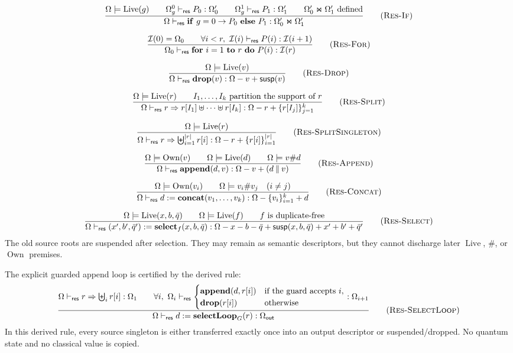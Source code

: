 \documentclass{report}
\theoremstyle{defn_style}
\providecommand{\Live}{\operatorname{Live}}
\providecommand{\Own}{\operatorname{Own}}
\providecommand{\susp}{\mathsf{susp}}
\begin{document}
\[
\frac{
  \Omega\models\Live(g)
  \qquad
  \Omega_g^0\vdash_{\mathsf{res}}P_0:\Omega_0'
  \qquad
  \Omega_g^1\vdash_{\mathsf{res}}P_1:\Omega_1'
  \qquad
  \Omega_0'\Join\Omega_1'\ \text{defined}
}{
  \Omega\vdash_{\mathsf{res}}
  \mathbf{if}\ g=0\rightarrow P_0\ \mathbf{else}\ P_1
  :
  \Omega_0'\Join\Omega_1'
}
\tag{\textsc{Res-If}}
\]

\[
\frac{
  \mathcal I(0)=\Omega_0
  \qquad
  \forall i<r,\ 
  \mathcal I(i)\vdash_{\mathsf{res}}P(i):\mathcal I(i+1)
}{
  \Omega_0\vdash_{\mathsf{res}}
  \mathbf{for}\ i=1\ \mathbf{to}\ r\ \mathbf{do}\ P(i)
  :
  \mathcal I(r)
}
\tag{\textsc{Res-For}}
\]

\[
\frac{
  \Omega\models\Live(v)
}{
  \Omega\vdash_{\mathsf{res}}
  \mathbf{drop}(v)
  :
  \Omega-v+\susp(v)
}
\tag{\textsc{Res-Drop}}
\]

\[
\frac{
  \Omega\models\Live(r)
  \qquad
  I_1,\ldots,I_k\ \text{partition the support of }r
}{
  \Omega\vdash_{\mathsf{res}}
  r\Rightarrow r[I_1]\uplus\cdots\uplus r[I_k]
  :
  \Omega-r+\{r[I_j]\}_{j=1}^k
}
\tag{\textsc{Res-Split}}
\]

\[
\frac{
  \Omega\models\Live(r)
}{
  \Omega\vdash_{\mathsf{res}}
  r\Rightarrow \biguplus_{i=1}^{|r|}r[i]
  :
  \Omega-r+\{r[i]\}_{i=1}^{|r|}
}
\tag{\textsc{Res-SplitSingleton}}
\]

\[
\frac{
  \Omega\models\Own(v)
  \qquad
  \Omega\models\Live(d)
  \qquad
  \Omega\models v\# d
}{
  \Omega\vdash_{\mathsf{res}}
  \mathbf{append}(d,v)
  :
  \Omega-v+(d\mathbin{\|}v)
}
\tag{\textsc{Res-Append}}
\]

\[
\frac{
  \Omega\models\Own(v_i)
  \qquad
  \Omega\models v_i\#v_j\quad(i\neq j)
}{
  \Omega\vdash_{\mathsf{res}}
  d:=\mathbf{concat}(v_1,\ldots,v_k)
  :
  \Omega-\{v_i\}_{i=1}^k+d
}
\tag{\textsc{Res-Concat}}
\]

\[
\frac{
  \Omega\models\Live(x,b,\bar q)
  \qquad
  \Omega\models\Live(f)
  \qquad
  f\ \text{is duplicate-free}
}{
  \Omega\vdash_{\mathsf{res}}
  (x',b',\bar q'):=\mathbf{select}_f(x,b,\bar q)
  :
  \Omega-x-b-\bar q+\susp(x,b,\bar q)+x'+b'+\bar q'
}
\tag{\textsc{Res-Select}}
\]
The old source roots are suspended after selection.  They may remain as semantic
descriptors, but they cannot discharge later \(\Live\), \(\#\), or \(\Own\)
premises.

The explicit guarded append loop is certified by the derived rule:
\[
\frac{
  \Omega\vdash_{\mathsf{res}}
  r\Rightarrow\biguplus_i r[i]:\Omega_1
  \qquad
  \forall i,\ 
  \Omega_i\vdash_{\mathsf{res}}
  \begin{cases}
    \mathbf{append}(d,r[i]) & \text{if the guard accepts }i,\\
    \mathbf{drop}(r[i]) & \text{otherwise}
  \end{cases}
  :
  \Omega_{i+1}
}{
  \Omega\vdash_{\mathsf{res}}
  d:=\mathbf{selectLoop}_{G}(r)
  :
  \Omega_{\mathsf{out}}
}
\tag{\textsc{Res-SelectLoop}}
\]
In this derived rule, every source singleton is either transferred exactly once
into an output descriptor or suspended/dropped.  No quantum state and no
classical value is copied.
\end{document}
